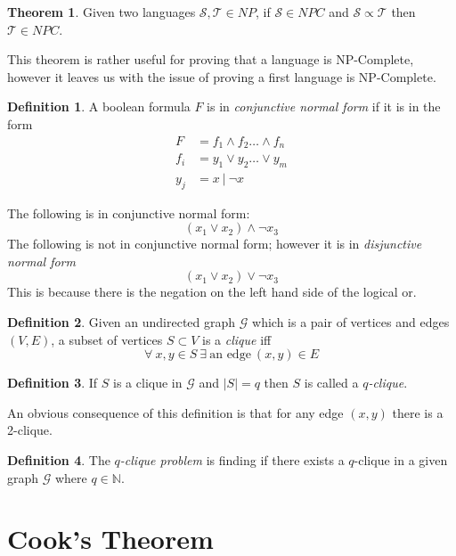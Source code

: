 \documentclass{article}
\theoremstyle{definition}
\newtheorem{definition}{Definition}[section]
\newtheorem{theorem}{Theorem}[section]
\begin{document}
\begin{theorem}
	Given two languages $\mathcal{S}, \mathcal{T} \in NP$,
	if $\mathcal{S} \in NPC$ and $\mathcal{S} \propto \mathcal{T}$ then
	$\mathcal{T} \in NPC$.
\end{theorem}

This theorem is rather useful for proving that a language is NP-Complete,
however it leaves us with the issue of proving a first language is NP-Complete.

\begin{definition}
	A boolean formula $F$ is in \textit{conjunctive normal form} if it is in the form
	\begin{equation}
	\begin{split}
		F &= f_1 \land f_2 \dots \land f_n \\
		f_i &= y_1 \lor y_2 \dots \lor y_m \\
		y_j &= x\ |\ \neg x
	\end{split}
	\end{equation}
\end{definition}

The following is in conjunctive normal form:
$$(x_1 \lor x_2) \land \neg x_3$$
The following is not in conjunctive normal form;
however it is in \textit{disjunctive normal form}
$$(x_1 \lor x_2) \lor \neg x_3$$
This is because there is the negation on the left hand side of the logical or.

\begin{definition}
	Given an undirected graph $\mathcal{G}$ which is a pair of vertices and edges $(V,E)$,
	a subset of vertices $S \subset V$ is a \textit{clique} iff
	$$\forall\ x, y \in S\ \exists\ \textrm{an edge}\ (x,y) \in E$$
\end{definition}

\begin{definition}
	If $S$ is a clique in $\mathcal{G}$ and $|S| = q$ then $S$ is called a \textit{$q$-clique}.
\end{definition}

An obvious consequence of this definition is that for any edge $(x,y)$ there is a 2-clique.

\begin{definition}
	The \textit{$q$-clique problem} is finding if there exists a $q$-clique in a given graph
	$\mathcal{G}$ where $q \in \mathbb{N}$.
\end{definition}

\section{Cook’s Theorem}
\end{document}
